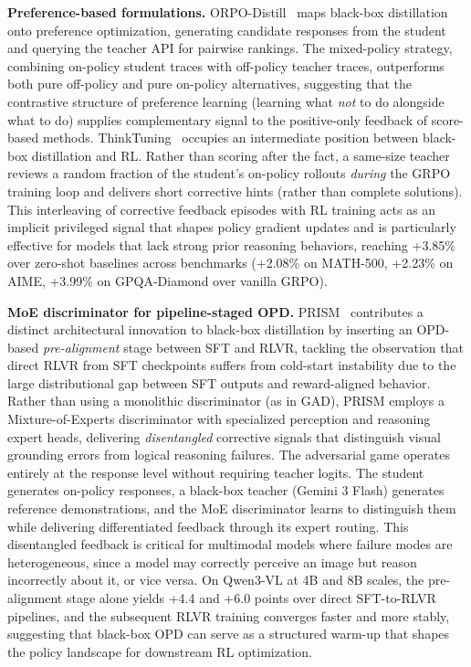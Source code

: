 \documentclass{article} %
\begin{document}
\textbf{Preference-based formulations.} ORPO-Distill~\citep{2509.25100} maps black-box distillation onto preference optimization, generating candidate responses from the student and querying the teacher API for pairwise rankings. The mixed-policy strategy, combining on-policy student traces with off-policy teacher traces, outperforms both pure off-policy and pure on-policy alternatives, suggesting that the contrastive structure of preference learning (learning what \emph{not} to do alongside what to do) supplies complementary signal to the positive-only feedback of score-based methods. ThinkTuning~\citep{rrv2025thinktuning} occupies an intermediate position between black-box distillation and RL. Rather than scoring after the fact, a same-size teacher reviews a random fraction of the student's on-policy rollouts \emph{during} the GRPO training loop and delivers short corrective hints (rather than complete solutions). This interleaving of corrective feedback episodes with RL training acts as an implicit privileged signal that shapes policy gradient updates and is particularly effective for models that lack strong prior reasoning behaviors, reaching +3.85\% over zero-shot baselines across benchmarks (+2.08\% on MATH-500, +2.23\% on AIME, +3.99\% on GPQA-Diamond over vanilla GRPO).

\textbf{MoE discriminator for pipeline-staged OPD.} PRISM~\citep{wang2026prism} contributes a distinct architectural innovation to black-box distillation by inserting an OPD-based \emph{pre-alignment} stage between SFT and RLVR, tackling the observation that direct RLVR from SFT checkpoints suffers from cold-start instability due to the large distributional gap between SFT outputs and reward-aligned behavior. Rather than using a monolithic discriminator (as in GAD), PRISM employs a Mixture-of-Experts discriminator with specialized perception and reasoning expert heads, delivering \emph{disentangled} corrective signals that distinguish visual grounding errors from logical reasoning failures. The adversarial game operates entirely at the response level without requiring teacher logits. The student generates on-policy responses, a black-box teacher (Gemini 3 Flash) generates reference demonstrations, and the MoE discriminator learns to distinguish them while delivering differentiated feedback through its expert routing. This disentangled feedback is critical for multimodal models where failure modes are heterogeneous, since a model may correctly perceive an image but reason incorrectly about it, or vice versa. On Qwen3-VL at 4B and 8B scales, the pre-alignment stage alone yields +4.4 and +6.0 points over direct SFT-to-RLVR pipelines, and the subsequent RLVR training converges faster and more stably, suggesting that black-box OPD can serve as a structured warm-up that shapes the policy landscape for downstream RL optimization.
\end{document}
